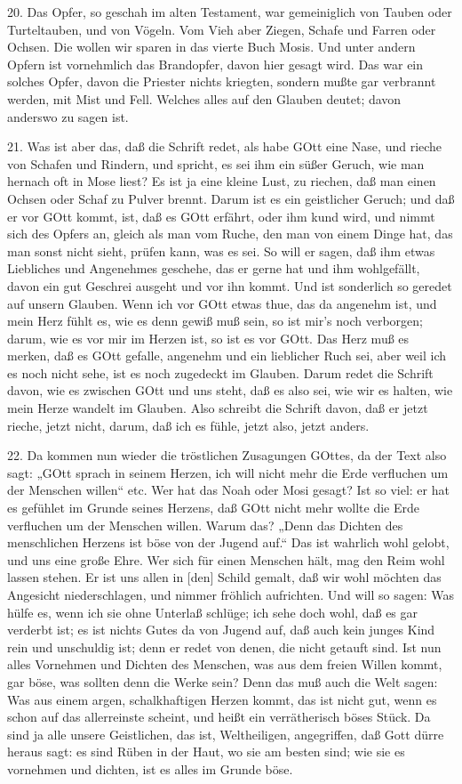 20. Das Opfer, so geschah im alten Testament, war gemeiniglich von Tauben oder Turteltauben, und von Vögeln. Vom Vieh aber Ziegen, Schafe und Farren oder Ochsen. Die wollen wir sparen in das vierte Buch Mosis. Und unter andern Opfern ist vornehmlich das Brandopfer, davon hier gesagt wird. Das war ein solches Opfer, davon die Priester nichts kriegten, sondern mußte gar verbrannt werden, mit Mist und Fell. Welches alles auf den Glauben deutet; davon anderswo zu sagen ist.

21. Was ist aber das, daß die Schrift redet, als habe GOtt eine Nase, und rieche von Schafen und Rindern, und spricht, es sei ihm ein süßer Geruch, wie man hernach oft in Mose liest? Es ist ja eine kleine Lust, zu riechen, daß man einen Ochsen oder Schaf zu Pulver brennt. Darum ist es ein geistlicher Geruch; und daß er vor GOtt kommt, ist, daß es GOtt erfährt, oder ihm kund wird, und nimmt sich des Opfers an, gleich als man vom Ruche, den man von einem Dinge hat, das man sonst nicht sieht, prüfen kann, was es sei. So will er sagen, daß ihm etwas Liebliches und Angenehmes geschehe, das er gerne hat und ihm wohlgefällt, davon ein gut Geschrei ausgeht und vor ihn kommt. Und ist sonderlich so geredet auf unsern Glauben. Wenn ich vor GOtt etwas thue, das da angenehm ist, und mein Herz fühlt es, wie es denn gewiß muß sein, so ist mir's noch verborgen; darum, wie es vor mir im Herzen ist, so ist es vor GOtt. Das Herz muß es merken, daß es GOtt gefalle, angenehm und ein lieblicher Ruch sei, aber weil ich es noch nicht sehe, ist es noch zugedeckt im Glauben. Darum redet die Schrift davon, wie es zwischen GOtt und uns steht, daß es also sei, wie wir es halten, wie mein Herze wandelt im Glauben. Also schreibt die Schrift davon, daß er jetzt rieche, jetzt nicht, darum, daß ich es fühle, jetzt also, jetzt anders.

22. Da kommen nun wieder die tröstlichen Zusagungen GOttes, da der Text also sagt: „GOtt sprach in seinem Herzen, ich will nicht mehr die Erde verfluchen um der Menschen willen“ etc. Wer hat das Noah oder Mosi gesagt? Ist so viel: er hat es gefühlet im Grunde seines Herzens, daß GOtt nicht mehr wollte die Erde verfluchen um der Menschen willen. Warum das? „Denn das Dichten des menschlichen Herzens ist böse von der Jugend auf.“ Das ist wahrlich wohl gelobt, und uns eine große Ehre. Wer sich für einen Menschen hält, mag den Reim wohl lassen stehen. Er ist uns allen in [den] Schild gemalt, daß wir wohl möchten das Angesicht niederschlagen, und nimmer fröhlich aufrichten. Und will so sagen: Was hülfe es, wenn ich sie ohne Unterlaß schlüge; ich sehe doch wohl, daß es gar verderbt ist; es ist nichts
Gutes da von Jugend auf, daß auch kein junges Kind rein und unschuldig ist; denn er redet von denen, die nicht getauft sind. Ist nun alles Vornehmen und Dichten des Menschen, was aus dem freien Willen kommt, gar böse, was sollten denn die Werke sein? Denn das muß auch die Welt sagen: Was aus einem argen, schalkhaftigen Herzen kommt, das ist nicht gut, wenn es schon auf das allerreinste scheint, und heißt ein verrätherisch böses Stück. Da sind ja alle unsere Geistlichen, das ist, Weltheiligen, angegriffen, daß Gott dürre heraus sagt: es sind Rüben in der Haut, wo sie am besten sind; wie sie es vornehmen und dichten, ist es alles im Grunde böse.

